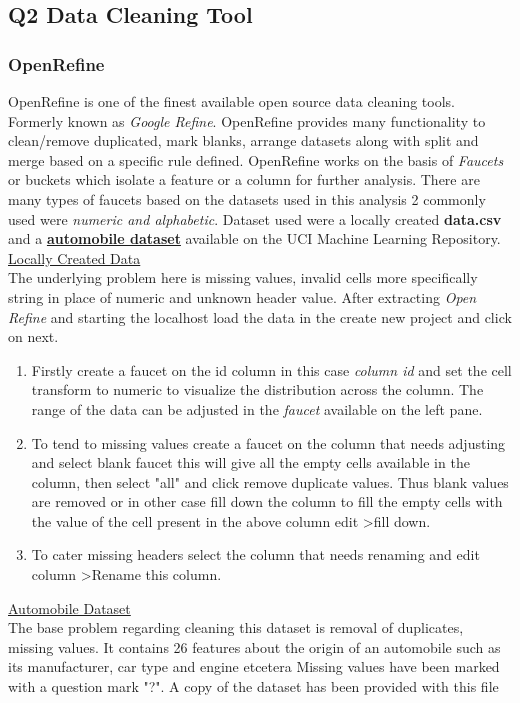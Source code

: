 \documentclass[12pt]{article}
\begin{document}
\subsection*{Q2 Data Cleaning Tool}

\subsubsection*{OpenRefine}
OpenRefine is one of the finest available open source data cleaning tools. Formerly known as \emph{Google Refine}. OpenRefine provides many functionality to clean/remove duplicated, mark blanks, arrange datasets along with split and merge based on a specific rule defined. OpenRefine works on the basis of \emph{Faucets} or buckets which isolate a feature or a column for further analysis. There are many types of faucets based on the datasets used in this analysis 2 commonly used were \emph{numeric and alphabetic}. Dataset used were a locally created \textbf{data.csv} and a \href{http://archive.ics.uci.edu/ml/datasets/Automobile}{\textbf{automobile dataset}} available on the UCI Machine Learning Repository.\\
\underline{Locally Created Data} \\
The underlying problem here is missing values, invalid cells more specifically string in place of numeric and unknown header value. After extracting \emph{Open Refine} and starting the localhost load the data in the create new project and click on next.

\begin{enumerate}
	\item Firstly create a faucet on the id column in this case \emph{column id} and set the cell transform to numeric to visualize the distribution across the column. The range of the data can be adjusted in the \emph{faucet} available on the left pane.
	\item To tend to missing values create a faucet on the column that needs adjusting and select blank faucet this will give all the empty cells available in the column, then select "all" and click remove duplicate values. Thus blank values are removed or in other case fill down the column to fill the empty cells with the value of the cell present in the above column edit \textgreater fill down.
	\item To cater missing headers select the column that needs renaming and edit column \textgreater Rename this column.
\end{enumerate}

\underline{Automobile Dataset} \\
The base problem regarding cleaning this dataset is removal of duplicates, missing values. It contains 26 features about the origin of an automobile such as its manufacturer, car type and engine etcetera Missing values have been marked with a question mark "?".
A copy of the dataset has been provided with this file
\end{document}
